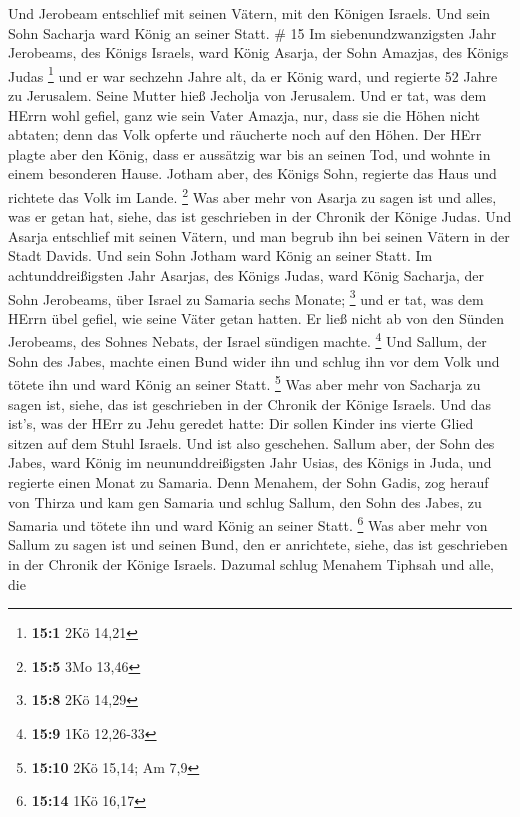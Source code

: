  Und Jerobeam entschlief mit seinen Vätern, mit den Königen
Israels. Und sein Sohn Sacharja ward König an seiner Statt. \# 15
 Im siebenundzwanzigsten Jahr Jerobeams, des Königs Israels,
ward König Asarja, der Sohn Amazjas, des Königs Judas \footnote{\textbf{15:1}
  2Kö 14,21}  und er war sechzehn Jahre alt, da er König
ward, und regierte 52 Jahre zu Jerusalem. Seine Mutter hieß Jecholja von
Jerusalem.  Und er tat, was dem HErrn wohl gefiel, ganz wie
sein Vater Amazja,  nur, dass sie die Höhen nicht abtaten;
denn das Volk opferte und räucherte noch auf den Höhen.  Der
HErr plagte aber den König, dass er aussätzig war bis an seinen Tod, und
wohnte in einem besonderen Hause. Jotham aber, des Königs Sohn, regierte
das Haus und richtete das Volk im Lande. \footnote{\textbf{15:5} 3Mo
  13,46}  Was aber mehr von Asarja zu sagen ist und alles,
was er getan hat, siehe, das ist geschrieben in der Chronik der Könige
Judas.  Und Asarja entschlief mit seinen Vätern, und man
begrub ihn bei seinen Vätern in der Stadt Davids. Und sein Sohn Jotham
ward König an seiner Statt.  Im achtunddreißigsten Jahr
Asarjas, des Königs Judas, ward König Sacharja, der Sohn Jerobeams, über
Israel zu Samaria sechs Monate; \footnote{\textbf{15:8} 2Kö 14,29}
 und er tat, was dem HErrn übel gefiel, wie seine Väter
getan hatten. Er ließ nicht ab von den Sünden Jerobeams, des Sohnes
Nebats, der Israel sündigen machte. \footnote{\textbf{15:9} 1Kö 12,26-33}
 Und Sallum, der Sohn des Jabes, machte einen Bund wider
ihn und schlug ihn vor dem Volk und tötete ihn und ward König an seiner
Statt. \footnote{\textbf{15:10} 2Kö 15,14; Am 7,9}  Was
aber mehr von Sacharja zu sagen ist, siehe, das ist geschrieben in der
Chronik der Könige Israels.  Und das ist's, was der HErr zu
Jehu geredet hatte: Dir sollen Kinder ins vierte Glied sitzen auf dem
Stuhl Israels. Und ist also geschehen.  Sallum aber, der
Sohn des Jabes, ward König im neununddreißigsten Jahr Usias, des Königs
in Juda, und regierte einen Monat zu Samaria.  Denn
Menahem, der Sohn Gadis, zog herauf von Thirza und kam gen Samaria und
schlug Sallum, den Sohn des Jabes, zu Samaria und tötete ihn und ward
König an seiner Statt. \footnote{\textbf{15:14} 1Kö 16,17} 
Was aber mehr von Sallum zu sagen ist und seinen Bund, den er
anrichtete, siehe, das ist geschrieben in der Chronik der Könige
Israels.  Dazumal schlug Menahem Tiphsah und alle, die
